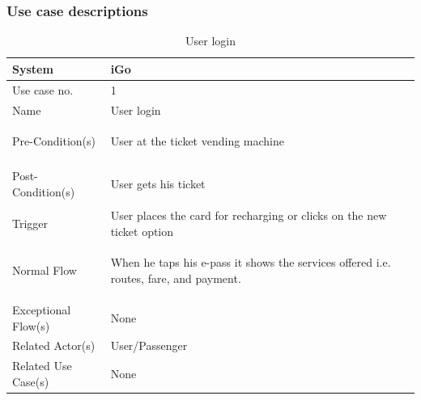\documentclass{article}
\begin{document}
\subsubsection{Use case descriptions}
\begin{table}[ht]
    \centering
    \begin{tabular}{|l|p{11cm}|}
         \hline
         System& iGo\\
         \hline
         Use case no. & 1 \\
         \hline
         Name & User login \\
         \hline
         Pre-Condition(s)   & 
         \begin{enumerate*}[itemjoin=\newline]
             \item User at the ticket vending machine
         \end{enumerate*} \\
         \hline
         Post-Condition(s)  & 
         \begin{enumerate*}[itemjoin=\newline]
             \item User gets his ticket 
         \end{enumerate*} \\
         \hline
         Trigger& User places the card for recharging or clicks on the new ticket option \\
         \hline
         Normal Flow        & 
         \begin{enumerate*}[itemjoin=\newline]
             \item When he taps his e-pass it shows the services offered i.e. routes, fare, and payment. 
         \end{enumerate*} \\
         \hline
         Exceptional Flow(s)& None\\
         \hline
         Related Actor(s)   & User/Passenger\\
         \hline
         Related Use Case(s)& None\\
         \hline
    \end{tabular}
    \caption{User login}
    \label{tab:UC_login}
\end{table}
\end{document}
